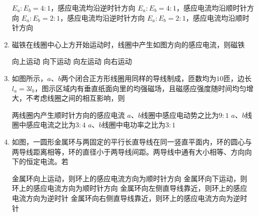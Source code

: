 \begin{enumerate}
\fourchoices
{$ E_a:E_b=4:1 $，感应电流均沿逆时针方向}
{$ E_a:E_b=4:1 $，感应电流均沿顺时针方向}
{$ E_a:E_b=2:1 $，感应电流均沿逆时针方向}
{$ E_a:E_b=2:1 $，感应电流均沿顺时针方向}



\item 
{}
磁铁在线圈中心上方开始运动时，线圈中产生如图方向的感应电流，则磁铁  

\begin{minipage}[h!]{0.7\linewidth}
\vspace{0.3em}
\fourchoices
{向上运动 }
{向下运动}
{向左运动}
{向右运动}
\vspace{0.3em}
\end{minipage}
\hfill
\begin{minipage}[h!]{0.3\linewidth}
\flushright
\vspace{0.3em}

\vspace{0.3em}
\end{minipage}





\item 
{}
如图所示，$ a $、$ b $两个闭合正方形线圈用同样的导线制成，匝数均为$ 10 $匝，边长$ l_a=3l_b $，图示区域内有垂直纸面向里的均强磁场，且磁感应强度随时间均匀增大，不考虑线圈之间的相互影响，则  
\begin{figure}[h!]
\centering

\end{figure}


\fourchoices
{两线圈内产生顺时针方向的感应电流}
{$ a $、$ b $线圈中感应电动势之比为$ 9:1 $}
{$ a $、$ b $线圈中感应电流之比为$ 3:4 $}
{$ a $、$ b $线圈中电功率之比为$ 3:1 $}




\item 
{}
如图，一圆形金属环与两固定的平行长直导线在同一竖直平面内，环的圆心与两导线距离相等，环的直径小于两导线间距。两导线中通有大小相等、方向向下的恒定电流。若  


\begin{minipage}[h!]{0.7\linewidth}
\vspace{0.3em}
\fourchoices
{金属环向上运动，则环上的感应电流方向为顺时针方向}
{金属环向下运动，则环上的感应电流方向为顺时针方向}
{金属环向左侧直导线靠近，则环上的感应电流方向为逆时针}
{金属环向右侧直导线靠近，则环上的感应电流方向为逆时针}


\end{minipage}
\end{enumerate}
